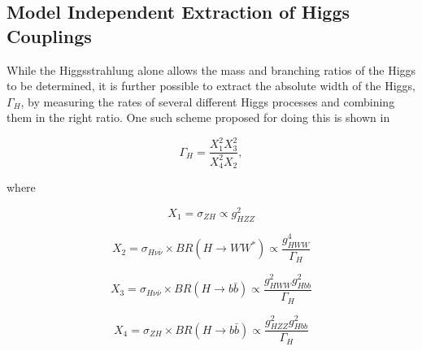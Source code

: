  
\subsection{Model Independent Extraction of Higgs Couplings}


While the Higgsstrahlung alone allows the mass and branching ratios of the Higgs to be determined, it is further possible to extract the absolute width of the Higgs, $\Gamma_H$, by measuring the rates of several different Higgs processes and combining them in the right ratio. One such scheme proposed for doing this is shown in  \cite{Durig:2014lfa}

\begin{equation}
  \label{modelindependentformula}
  \Gamma_H = \frac{X_1^2X_3^2}{X_4^2X_2},
\end{equation}

where

\begin{equation}
X_1=\sigma_{ZH} \propto g_{HZZ}^2
\end{equation}

\begin{equation}
  \label{X2}
  X_2=\sigma_{H\nu\bar{\nu}} \times BR(H\rightarrow WW^*) \propto \frac{g_{HWW}^4}{\Gamma_H}
\end{equation}

\begin{equation}
X_3=\sigma_{H\nu\bar{\nu}} \times BR(H\rightarrow b\bar{b}) \propto \frac{g_{HWW}^{2}g_{Hbb}^2}{\Gamma_H}
\end{equation}

\begin{equation}
X_4=\sigma_{ZH} \times BR(H\rightarrow b\bar{b}) \propto \frac{g_{HZZ}^{2}g_{Hbb}^2}{\Gamma_H}
\end{equation}

